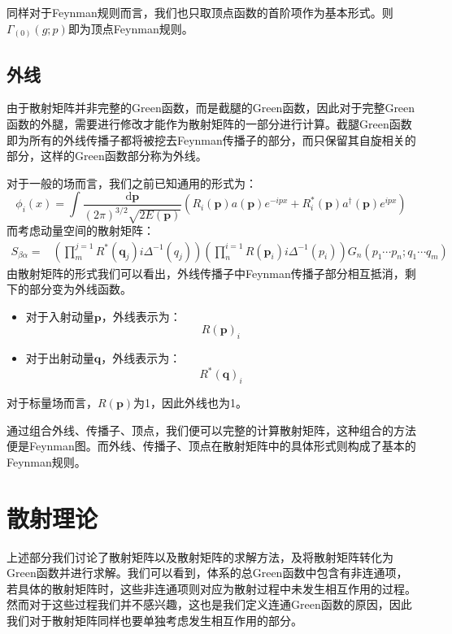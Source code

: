 同样对于Feynman规则而言，我们也只取顶点函数的首阶项作为基本形式。则$\Gamma_{(0)}(g;p)$即为顶点Feynman规则。
\subsection{外线}
由于散射矩阵并非完整的Green函数，而是截腿的Green函数，因此对于完整Green函数的外腿，需要进行修改才能作为散射矩阵的一部分进行计算。截腿Green函数即为所有的外线传播子都将被挖去Feynman传播子的部分，而只保留其自旋相关的部分，这样的Green函数部分称为外线。

对于一般的场而言，我们之前已知通用的形式为：
\begin{equation}
\phi_i(x)=\int\frac{\mathrm{d}\boldsymbol{p}}{(2\pi)^{3/2}\sqrt{2E(\boldsymbol{p})}}\left(R_i(\boldsymbol{p})a(\boldsymbol{p})e^{-ipx} +R_i^*(\boldsymbol{p})a^\dagger(\boldsymbol{p})e^{ipx} \right)
\end{equation}
而考虑动量空间的散射矩阵：
\begin{align}
S_{\beta\alpha}=&\left(\prod_{m}^{j=1} R^*(\boldsymbol{q}_j)i\Delta^{-1}(q_j)\right)\left(\prod_{n}^{i=1}R(\boldsymbol{p}_i)i\Delta^{-1}(p_i)\right)G_n(p_1\cdots p_n;q_1\cdots q_m)
\end{align}
由散射矩阵的形式我们可以看出，外线传播子中Feynman传播子部分相互抵消，剩下的部分变为外线函数。
\begin{itemize}
	\item 对于入射动量$\boldsymbol{p}$，外线表示为：
	\begin{equation}
	R(\boldsymbol{p})_i 
	\end{equation}
	\item 对于出射动量$\boldsymbol{q}$，外线表示为：
	\begin{equation}
	R^*(\boldsymbol{q})_i 
	\end{equation}
\end{itemize}

对于标量场而言，$R(\boldsymbol{p})$为1，因此外线也为1。

通过组合外线、传播子、顶点，我们便可以完整的计算散射矩阵，这种组合的方法便是Feynman图。而外线、传播子、顶点在散射矩阵中的具体形式则构成了基本的Feynman规则。


\section{散射理论}
上述部分我们讨论了散射矩阵以及散射矩阵的求解方法，及将散射矩阵转化为Green函数并进行求解。我们可以看到，体系的总Green函数中包含有非连通项，若具体的散射矩阵时，这些非连通项则对应为散射过程中未发生相互作用的过程。然而对于这些过程我们并不感兴趣，这也是我们定义连通Green函数的原因，因此我们对于散射矩阵同样也要单独考虑发生相互作用的部分。

